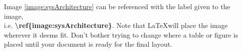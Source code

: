 Image \ref{image:sysArchitecture} can be referenced with the label given to the image, \\ i.e. \textbf{\textbackslash{}ref\{image:sysArchitecture\}}. Note that \LaTeX will place the image wherever it deems fit. Don't bother trying to change where a table or figure is placed until your document is ready for the final layout.
